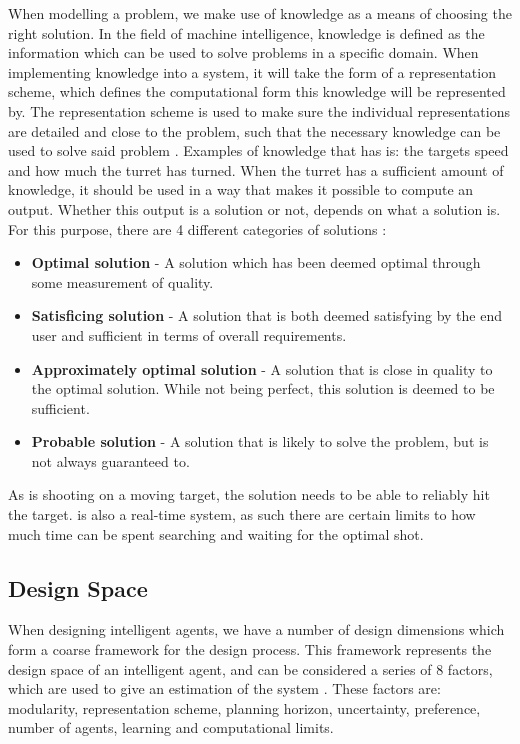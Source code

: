 When modelling a problem, we make use of knowledge as a means of choosing the
right solution. In the field of machine intelligence, knowledge is defined as
the information which can be used to solve problems in a specific domain. When
implementing knowledge into a system, it will take the form of a representation
scheme, which defines the computational form this knowledge will be represented
by. The representation scheme is used to make sure the individual
representations are detailed and close to the problem, such that the necessary
knowledge can be used to solve said problem \citep[ch.1.4]{MIBook}.
Examples of knowledge that \name has is: the targets speed and how much the
turret has turned. When the turret has a sufficient amount of knowledge, it
should be used in a way that makes it possible to compute an output. Whether
this output is a solution or not, depends on what a solution is. For this
purpose, there are 4 different categories of solutions \citep[ch.1.4.1]{MIBook}:

\begin{itemize}
  \item \textbf{Optimal solution} - A solution which has been deemed optimal
  through some measurement of quality.
  \item \textbf{Satisficing solution} - A solution that is both deemed
  satisfying by the end user and sufficient in terms of overall requirements. 
  \item \textbf{Approximately optimal solution} - A solution that is close in
  quality to the optimal solution. While not being perfect, this solution is
  deemed to be sufficient.
  \item \textbf{Probable solution} - A solution that is likely to solve the
  problem, but is not always guaranteed to.
\end{itemize}

As \name is shooting on a moving target, the solution needs to be able
to  reliably hit the target. \name is also a real-time system, as such there are
certain limits to how much time can be spent searching and waiting for the
optimal shot.

\subsection{Design Space}
When designing intelligent agents, we have a number of design dimensions which
form a coarse framework for the design process. This framework represents the
design space of an intelligent agent, and can be considered a series of 8
factors, which are used to give an estimation of the system
\citep[ch.1.5]{MIBook}. These factors are: modularity, representation scheme,
planning horizon, uncertainty, preference, number of agents, learning and
computational limits.

